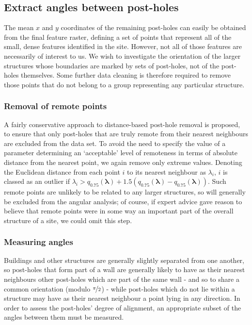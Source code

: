 \documentclass[../../ArchStats.tex]{subfiles}
\begin{document}
\subsection{Extract angles between post-holes}
\label{sec:posts-to-angles}

The mean $x$ and $y$ coordinates of the remaining post-holes can easily be obtained from the final feature raster, defining a set of points that represent all of the small, dense features identified in the site. However, not all of those features are necessarily of interest to us. We wish to investigate the orientation of the larger structures whose boundaries are marked by sets of post-holes, not of the post-holes themselves. Some further data cleaning is therefore required to remove those points that do not belong to a group representing any particular structure. 

\subsubsection{Removal of remote points}
\label{sec:filter-rectilinear}

A fairly conservative approach to distance-based post-hole removal is proposed, to ensure that only post-holes that are truly remote from their nearest neighbours are excluded from the data set. To avoid the need to  specify the value of a parameter determining an `acceptable' level of remoteness in terms of absolute distance from the nearest point, we again remove only  extreme values. Denoting the Euclidean distance from each point $i$ to its nearest neighbour as $\lambda_i$, $i$ is classed as an outlier if $\lambda_i > q_{0.75}(\boldsymbol{\lambda}) + 1.5 \left(q_{0.75}(\boldsymbol{\lambda}) - q_{0.75}(\boldsymbol{\lambda}) \right)$. Such remote points are unlikely to be related to any larger structures, so will generally be excluded from the angular analysis; of course, if expert advice gave reason to believe that remote points were in some way an important part of the overall structure of a site, we could omit this step.


\subsubsection{Measuring angles}

Buildings and other structures are generally slightly separated from one another, so post-holes that form part of a wall are generally likely to have as their nearest neighbours other post-holes which are part of the same wall - and so to share a common orientation (modulo $\nicefrac{\pi}{2}$) - while post-holes which do not lie within a structure may have as their nearest neighbour a point lying in any direction. In order to assess the post-holes' degree of alignment, an appropriate subset of the angles between them must be measured.
\end{document}
